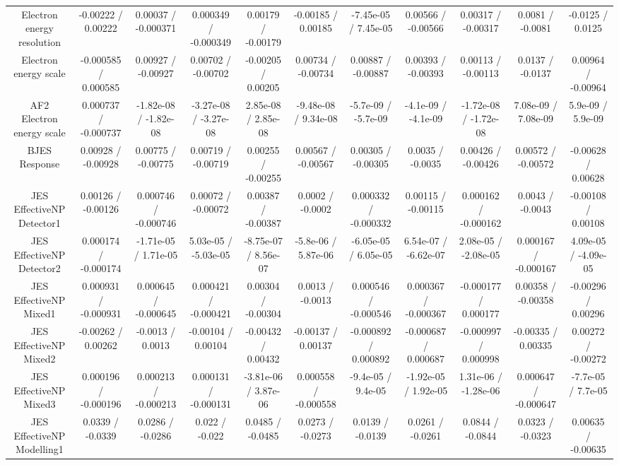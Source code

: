 \begin{table}[htbp]
\begin{center}
\begin{tabular}{|c|c|c|c|c|c|c|c|c|c|c|}
  Electron energy resolution & -0.00222 / 0.00222 & 0.00037 / -0.000371 & 0.000349 / -0.000349 & 0.00179 / -0.00179 & -0.00185 / 0.00185 & -7.45e-05 / 7.45e-05 & 0.00566 / -0.00566 & 0.00317 / -0.00317 & 0.0081 / -0.0081 & -0.0125 / 0.0125 \\ 
  Electron energy scale & -0.000585 / 0.000585 & 0.00927 / -0.00927 & 0.00702 / -0.00702 & -0.00205 / 0.00205 & 0.00734 / -0.00734 & 0.00887 / -0.00887 & 0.00393 / -0.00393 & 0.00113 / -0.00113 & 0.0137 / -0.0137 & 0.00964 / -0.00964 \\ 
  AF2 Electron energy scale & 0.000737 / -0.000737 & -1.82e-08 / -1.82e-08 & -3.27e-08 / -3.27e-08 & 2.85e-08 / 2.85e-08 & -9.48e-08 / 9.34e-08 & -5.7e-09 / -5.7e-09 & -4.1e-09 / -4.1e-09 & -1.72e-08 / -1.72e-08 & 7.08e-09 / 7.08e-09 & 5.9e-09 / 5.9e-09 \\ 
  BJES Response & 0.00928 / -0.00928 & 0.00775 / -0.00775 & 0.00719 / -0.00719 & 0.00255 / -0.00255 & 0.00567 / -0.00567 & 0.00305 / -0.00305 & 0.0035 / -0.0035 & 0.00426 / -0.00426 & 0.00572 / -0.00572 & -0.00628 / 0.00628 \\ 
  JES EffectiveNP Detector1 & 0.00126 / -0.00126 & 0.000746 / -0.000746 & 0.00072 / -0.00072 & 0.00387 / -0.00387 & 0.0002 / -0.0002 & 0.000332 / -0.000332 & 0.00115 / -0.00115 & 0.000162 / -0.000162 & 0.0043 / -0.0043 & -0.00108 / 0.00108 \\ 
  JES EffectiveNP Detector2 & 0.000174 / -0.000174 & -1.71e-05 / 1.71e-05 & 5.03e-05 / -5.03e-05 & -8.75e-07 / 8.56e-07 & -5.8e-06 / 5.87e-06 & -6.05e-05 / 6.05e-05 & 6.54e-07 / -6.62e-07 & 2.08e-05 / -2.08e-05 & 0.000167 / -0.000167 & 4.09e-05 / -4.09e-05 \\ 
  JES EffectiveNP Mixed1 & 0.000931 / -0.000931 & 0.000645 / -0.000645 & 0.000421 / -0.000421 & 0.00304 / -0.00304 & 0.0013 / -0.0013 & 0.000546 / -0.000546 & 0.000367 / -0.000367 & -0.000177 / 0.000177 & 0.00358 / -0.00358 & -0.00296 / 0.00296 \\ 
  JES EffectiveNP Mixed2 & -0.00262 / 0.00262 & -0.0013 / 0.0013 & -0.00104 / 0.00104 & -0.00432 / 0.00432 & -0.00137 / 0.00137 & -0.000892 / 0.000892 & -0.000687 / 0.000687 & -0.000997 / 0.000998 & -0.00335 / 0.00335 & 0.00272 / -0.00272 \\ 
  JES EffectiveNP Mixed3 & 0.000196 / -0.000196 & 0.000213 / -0.000213 & 0.000131 / -0.000131 & -3.81e-06 / 3.87e-06 & 0.000558 / -0.000558 & -9.4e-05 / 9.4e-05 & -1.92e-05 / 1.92e-05 & 1.31e-06 / -1.28e-06 & 0.000647 / -0.000647 & -7.7e-05 / 7.7e-05 \\ 
  JES EffectiveNP Modelling1 & 0.0339 / -0.0339 & 0.0286 / -0.0286 & 0.022 / -0.022 & 0.0485 / -0.0485 & 0.0273 / -0.0273 & 0.0139 / -0.0139 & 0.0261 / -0.0261 & 0.0844 / -0.0844 & 0.0323 / -0.0323 & 0.00635 / -0.00635 \\ 

\end{tabular}
\end{center}
\end{table}
